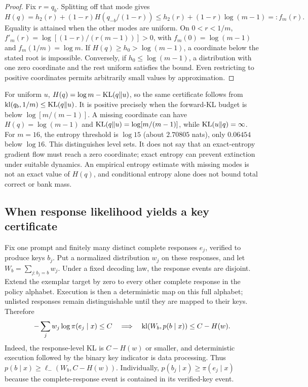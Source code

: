 \begin{proof}
Fix $r=q_b$. Splitting off that mode gives
\[
 H(q)=h_2(r)+(1-r)H(q_{-b}/(1-r))
 \le h_2(r)+(1-r)\log(m-1)=:f_m(r).
\]
Equality is attained when the other modes are uniform. On $0<r<1/m$,
$f'_m(r)=\log[(1-r)/(r(m-1))]>0$, with
$f_m(0)=\log(m-1)$ and $f_m(1/m)=\log m$.
If $H(q)\ge h_0>\log(m-1)$, a coordinate below the stated root is
impossible. Conversely, if $h_0\le\log(m-1)$, a distribution with one
zero coordinate and the rest uniform satisfies the bound. Even restricting
to positive coordinates permits arbitrarily small values by approximation.
\end{proof}

For uniform $u$, $H(q)=\log m-\operatorname{KL}(q\|u)$, so the same certificate follows
from $\operatorname{kl}(q_b,1/m)\le\operatorname{KL}(q\|u)$. It is positive precisely when the
forward-KL budget is below $\log[m/(m-1)]$. A missing coordinate can have
$H(q)=\log(m-1)$ and $\operatorname{KL}(q\|u)=\log[m/(m-1)]$, while
$\operatorname{KL}(u\|q)=\infty$. For $m=16$, the entropy threshold is $\log15$
(about $2.70805$ nats), only $0.06454$ below $\log16$.
This distinguishes level sets. It does not say that an exact-entropy gradient
flow must reach a zero coordinate; exact entropy can prevent extinction
under suitable dynamics. An empirical entropy estimate with missing modes
is not an exact value of $H(q)$, and conditional entropy alone does not
bound total correct or bank mass.

\subsection{When response likelihood yields a key certificate}
Fix one prompt and finitely many distinct complete responses $e_j$, verified
to produce keys $b_j$. Put a normalized distribution $w_j$ on these responses,
and let $W_b=\sum_{j:b_j=b}w_j$. Under a fixed decoding law, the response
events are disjoint. Extend the exemplar target by zero to every other
complete response in the policy alphabet. Execution is then a deterministic
map on this full alphabet; unlisted responses remain distinguishable until
they are mapped to their keys. Therefore
\[
 -\sum_jw_j\log\pi(e_j\mid x)\le C
 \quad\Longrightarrow\quad
 \operatorname{kl}(W_b,p(b\mid x))\le C-H(w).
\]
Indeed, the response-level KL is $C-H(w)$ or smaller, and deterministic
execution followed by the binary key indicator is data processing.
Thus $p(b\mid x)\ge\ell_-(W_b,C-H(w))$. Individually,
$p(b_j\mid x)\ge\pi(e_j\mid x)$ because the complete-response event is
contained in its verified-key event.

